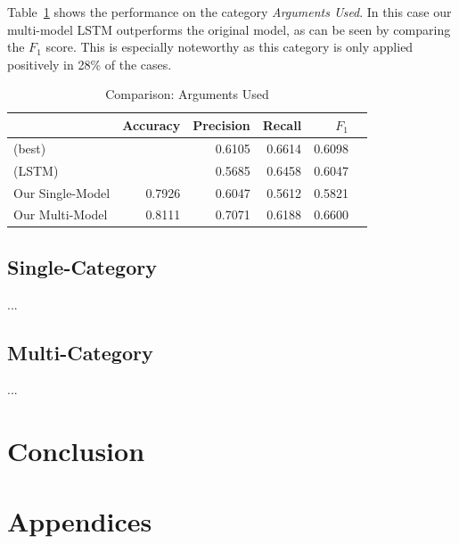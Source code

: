 \documentclass[11pt,a4paper]{article}
\begin{document}
Table~\ref{tab:results:arguments_used} shows the performance on the category \textit{Arguments Used}. In this case our multi-model LSTM outperforms the original model, as can be seen by comparing the $F_1$ score. This is especially noteworthy as this category is only applied positively in 28\% of the cases.  
\begin{table}[t!]
	\begin{center}	
			\begin{tabular}{l r r r r r}
			& Accuracy & Precision & Recall & $F_1$ \\
			\hline
			\cite{Schabus17} (best) & & 0.6105 & 0.6614 & 0.6098 \\
			\cite{Schabus17} (LSTM) & & 0.5685 & 0.6458 & 0.6047\\
			\hline
			Our Single-Model & 0.7926 & 0.6047 & 0.5612 & 0.5821 \\
			Our Multi-Model & 0.8111 & 0.7071 & 0.6188 & 0.6600 \\
		\end{tabular}
	\end{center}
	\caption{Comparison: Arguments Used}
	\label{tab:results:arguments_used}
\end{table}


\subsection{Single-Category}

...


\subsection{Multi-Category}

...

\section{Conclusion}




\appendix

\section{Appendices}
\label{sec:appendix}
\end{document}
